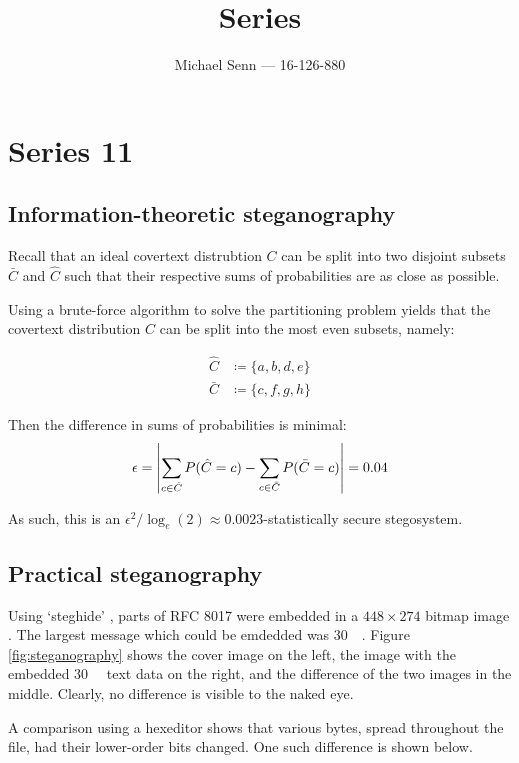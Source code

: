 \documentclass[a4paper]{scrreprt}
\title{Series \series}
\author{Michael Senn \maillink{michael.senn@students.unibe.ch} --- 16-126-880}
\date{\printdate}
\DeclarePairedDelimiter\abs{\lvert}{\rvert}
\newcommand{\series}{11}
\begin{document}
\maketitle


\setcounter{chapter}{\numexpr \series - 1 \relax}

\chapter{Series \series}

\section{Information-theoretic steganography}

Recall that an ideal covertext distrubtion $C$ can be split into two disjoint
subsets $\bar{C}$ and $\hat{C}$ such that their respective sums of
probabilities are as close as possible.

Using a brute-force algorithm to solve the partitioning problem yields that the
covertext distribution $C$ can be split into the most even subsets, namely:

\begin{align*}
		\hat{C} & \coloneqq \{a, b, d, e\} \\
		\bar{C} & \coloneqq \{c, f, g, h\}
\end{align*}

Then the difference in sums of probabilities is minimal:
\[
		\epsilon = \abs*{
				\sum_{c \in \hat{C}} P(\hat{C} = c) - 
		        \sum_{c \in \bar{C}} P(\bar{C} = c)} 
		= 0.04
\]

As such, this is an $\epsilon^2 / \log_e(2) \approx 0.0023$-statistically
secure stegosystem.

\section{Practical steganography}

Using `steghide' \autocite{hetzlGraphTheoreticApproach2005}, parts of RFC 8017
\autocite{rfc8017} were embedded in a $448 \times 274$ bitmap image
\autocite{munroeXkcd538Security}.  The largest message which could be emdedded
was \SI{30}{\kilo\byte}.  Figure \ref{fig:steganography} shows the cover image
on the left, the image with the embedded \SI{30}{\kilo\byte} text data on the
right, and the difference of the two images in the middle.  Clearly, no
difference is visible to the naked eye.

A comparison using a hexeditor shows that various bytes, spread throughout the
file, had their lower-order bits changed. One such difference is shown below.
\end{document}
